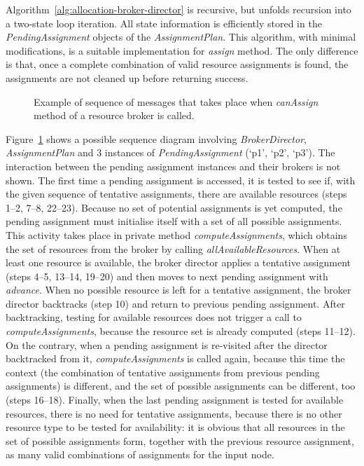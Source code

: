 \documentclass[a4paper,twoside]{tce}
\begin{document}
Algorithm~\ref{alg:allocation-broker-director} is recursive, but unfolds
recursion into a two-state loop iteration. All state information is
efficiently stored in the \emph{PendingAssignment} objects of the
\emph{AssignmentPlan}. This algorithm, with minimal modifications, is a
suitable implementation for \emph{assign} method. The only difference is
that, once a complete combination of valid resource assignments is found,
the assignments are not cleaned up before returning success.

\begin{figure}[tb]
\centerline{}
\caption{Example of sequence of messages that takes place when
  \emph{canAssign} method of a resource broker is called.}
  \label{fig:can-assign-sequence}
\end{figure}
%
Figure~\ref{fig:can-assign-sequence} shows a possible sequence diagram
involving \emph{BrokerDirector}, \emph{AssignmentPlan} and 3 instances of
\emph{PendingAssignment} (`p1', `p2', `p3'). The interaction between the
pending assignment instances and their brokers is not shown. The first time
a pending assignment is accessed, it is tested to see if, with the given
sequence of tentative assignments, there are available resources (steps
1--2, 7--8, 22--23). Because no set of potential assignments is yet
computed, the pending assignment must initialise itself with a set of all
possible assignments. This activity takes place in private method
\emph{computeAssignments}, which obtains the set of resources from the
broker by calling \emph{allAvailableResources}. When at least one resource
is available, the broker director applies a tentative assignment (steps
4--5, 13--14, 19--20) and then moves to next pending assignment with
\emph{advance}. When no possible resource is left for a tentative
assignment, the broker director backtracks (step 10) and return to previous
pending assignment. After backtracking, testing for available resources does
not trigger a call to \emph{computeAssignments}, because the resource set is
already computed (steps 11--12). On the contrary, when a pending assignment
is re-visited after the director backtracked from it,
\emph{computeAssignments} is called again, because this time the context
(the combination of tentative assignments from previous pending assignments)
is different, and the set of possible assignments can be different, too
(steps 16--18). Finally, when the last pending assignment is tested for
available resources, there is no need for tentative assignments, because
there is no other resource type to be tested for availability: it is obvious
that all resources in the set of possible assignments form, together with
the previous resource assignment, as many valid combinations of assignments
for the input node.
\end{document}
